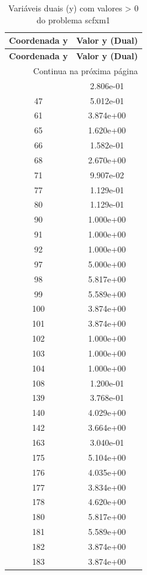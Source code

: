 \documentclass[12pt]{article}
\begin{document}
\begin{longtable}{@{}cc@{}}
\caption{Variáveis duais (y) com valores > 0 do problema scfxm1} \\
\toprule
\textbf{Coordenada y} & \textbf{Valor y (Dual)} \\
\midrule
\endfirsthead

\toprule
\textbf{Coordenada y} & \textbf{Valor y (Dual)} \\
\midrule
\endhead

\midrule \multicolumn{2}{r}{{Continua na próxima página}} \\ \midrule
\endfoot

\bottomrule
\endlastfoot
29 & 2.806e-01 \\
47 & 5.012e-01 \\
61 & 3.874e+00 \\
65 & 1.620e+00 \\
66 & 1.582e-01 \\
68 & 2.670e+00 \\
71 & 9.907e-02 \\
77 & 1.129e-01 \\
80 & 1.129e-01 \\
90 & 1.000e+00 \\
91 & 1.000e+00 \\
92 & 1.000e+00 \\
97 & 5.000e+00 \\
98 & 5.817e+00 \\
99 & 5.589e+00 \\
100 & 3.874e+00 \\
101 & 3.874e+00 \\
102 & 1.000e+00 \\
103 & 1.000e+00 \\
104 & 1.000e+00 \\
108 & 1.200e-01 \\
139 & 3.768e-01 \\
140 & 4.029e+00 \\
142 & 3.664e+00 \\
163 & 3.040e-01 \\
175 & 5.104e+00 \\
176 & 4.035e+00 \\
177 & 3.834e+00 \\
178 & 4.620e+00 \\
180 & 5.817e+00 \\
181 & 5.589e+00 \\
182 & 3.874e+00 \\
183 & 3.874e+00 \\

\end{longtable}
\end{document}
